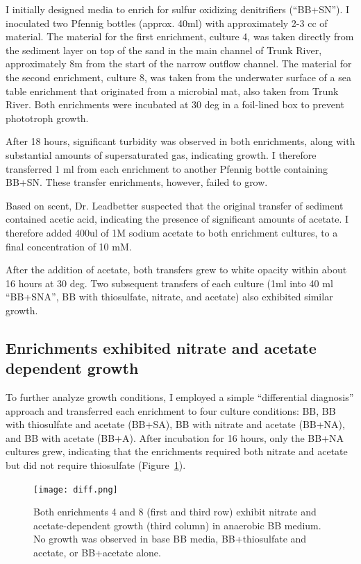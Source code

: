 \documentclass{article}
\begin{document}
I initially designed media to enrich for sulfur oxidizing denitrifiers
(``BB+SN'').  I inoculated two Pfennig bottles (approx. 40ml)
with approximately 2-3 cc of material.  The material for the first
enrichment, culture 4, was taken directly from the sediment layer on
top of the sand in the main channel of Trunk River, approximately 8m
from the start of the narrow outflow channel. The material for the
second enrichment, culture 8, was taken from the underwater surface of
a sea table enrichment that originated from a microbial mat, also
taken from Trunk River.  Both enrichments were incubated at 30 deg
in a foil-lined box to prevent phototroph growth.

After 18 hours, significant turbidity was observed in both
enrichments, along with substantial amounts of supersaturated gas,
indicating growth.  I therefore transferred 1 ml from each enrichment
to another Pfennig bottle containing BB+SN.  These transfer
enrichments, however, failed to grow.

Based on scent, Dr. Leadbetter suspected that the original transfer of
sediment contained acetic acid, indicating the presence of significant
amounts of acetate.  I therefore added 400ul of 1M sodium acetate to
both enrichment cultures, to a final concentration of 10 mM.

After the addition of acetate, both transfers grew to white opacity
within about 16 hours at 30 deg.  Two subsequent transfers of each
culture (1ml into 40 ml ``BB+SNA'', BB with thiosulfate, nitrate, and
acetate) also exhibited similar growth.

\subsection*{Enrichments exhibited nitrate and acetate dependent growth}

To further analyze growth conditions, I employed a simple
``differential diagnosis'' approach and transferred each enrichment to
four culture conditions: BB, BB with thiosulfate and acetate (BB+SA),
BB with nitrate and acetate (BB+NA), and BB with acetate (BB+A).
After incubation for 16 hours, only the BB+NA cultures grew, indicating that
the enrichments required both nitrate and acetate but did not require
thiosulfate (Figure~\ref{fig:diff}).

\begin{figure}[!ht]
  \centerline{\texttt{[image: diff.png]}}
  \caption{Both enrichments 4 and 8 (first and third row) exhibit
    nitrate and acetate-dependent growth (third column) in anaerobic BB medium. No growth was observed in base BB media, BB+thiosulfate and acetate, or BB+acetate alone.}
  \label{fig:diff}
\end{figure}
\end{document}
